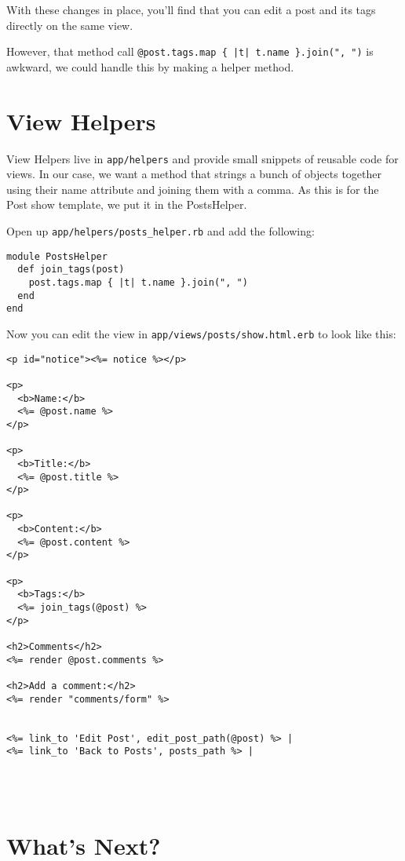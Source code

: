 \documentclass[10pt]{book}
\begin{document}
With these changes in place, you’ll find that you can edit a post and its tags directly on the same view.

However, that method call \texttt{@post.tags.map \{ |t| t.name \}.join(", ")} is awkward, we could handle this by making a helper method.

\section{ View Helpers}

View Helpers live in \texttt{app/helpers} and provide small snippets of reusable code for views. In our case, we want a method that strings a bunch of objects together using their name attribute and joining them with a comma. As this is for the Post show template, we put it in the PostsHelper.

Open up \texttt{app/helpers/posts\_helper.rb} and add the following:


\begin{verbatim}
module PostsHelper
  def join_tags(post)
    post.tags.map { |t| t.name }.join(", ")
  end
end
\end{verbatim}

Now you can edit the view in \texttt{app/views/posts/show.html.erb} to look like this:

\begin{minipage}{\textwidth}
\begin{verbatim}
<p id="notice"><%= notice %></p>
 
<p>
  <b>Name:</b>
  <%= @post.name %>
</p>
 
<p>
  <b>Title:</b>
  <%= @post.title %>
</p>
 
<p>
  <b>Content:</b>
  <%= @post.content %>
</p>
 
<p>
  <b>Tags:</b>
  <%= join_tags(@post) %>
</p>
 
<h2>Comments</h2>
<%= render @post.comments %>
 
<h2>Add a comment:</h2>
<%= render "comments/form" %>
 
 
<%= link_to 'Edit Post', edit_post_path(@post) %> |
<%= link_to 'Back to Posts', posts_path %> |
\end{verbatim}
\end{minipage}
\\ \\

\section{ What’s Next?}
\end{document}
